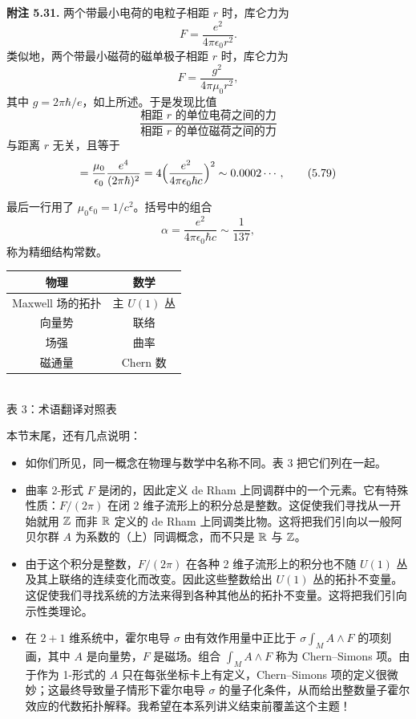 \textbf{附注 5.31.} 两个带最小电荷的电粒子相距 $r$ 时，库仑力为
\begin{equation}
  F=\frac{e^2}{4\pi\epsilon_0r^2}.
  \tag{5.76}
\end{equation}
类似地，两个带最小磁荷的磁单极子相距 $r$ 时，库仑力为
\begin{equation}
  F=\frac{g^2}{4\pi\mu_0r^2},
  \tag{5.77}
\end{equation}
其中 $g=2\pi\hbar/e$，如上所述。于是发现比值
\begin{equation}
  \frac{\text{相距 }r\text{ 的单位电荷之间的力}}{\text{相距 }r\text{ 的单位磁荷之间的力}}
  \tag{5.78}
\end{equation}
与距离 $r$ 无关，且等于
\begin{equation}
  =\frac{\mu_0}{\epsilon_0}\frac{e^4}{(2\pi\hbar)^2}
  =4\Bigl(\frac{e^2}{4\pi\epsilon_0\hbar c}\Bigr)^2\sim0.0002\cdots,
  \tag{5.79}
\end{equation}

最后一行用了 $\mu_0\epsilon_0=1/c^2$。括号中的组合
\begin{equation}
  \alpha=\frac{e^2}{4\pi\epsilon_0\hbar c}\sim\frac{1}{137},
  \tag{5.80}
\end{equation}
称为精细结构常数。\qedmark

\begin{center}
\begin{tabular}{cc}
\toprule
物理 & 数学\\
\midrule
Maxwell 场的拓扑 & 主 $U(1)$ 丛\\
向量势 & 联络\\
场强 & 曲率\\
磁通量 & Chern 数\\
\bottomrule
\end{tabular}\\[2pt]
{\small 表 3：术语翻译对照表}
\end{center}

本节末尾，还有几点说明：

\begin{itemize}
  \item 如你们所见，同一概念在物理与数学中名称不同。表 3 把它们列在一起。
  \item 曲率 2-形式 $F$ 是闭的，因此定义 de Rham 上同调群中的一个元素。它有特殊性质：$F/(2\pi)$ 在闭 2 维子流形上的积分总是整数。这促使我们寻找从一开始就用 $\mathbb{Z}$ 而非 $\mathbb{R}$ 定义的 de Rham 上同调类比物。这将把我们引向以一般阿贝尔群 $A$ 为系数的（上）同调概念，而不只是 $\mathbb{R}$ 与 $\mathbb{Z}$。
  \item 由于这个积分是整数，$F/(2\pi)$ 在各种 2 维子流形上的积分也不随 $U(1)$ 丛及其上联络的连续变化而改变。因此这些整数给出 $U(1)$ 丛的拓扑不变量。这促使我们寻找系统的方法来得到各种其他丛的拓扑不变量。这将把我们引向示性类理论。
  \item 在 $2+1$ 维系统中，霍尔电导 $\sigma$ 由有效作用量中正比于 $\sigma\int_MA\wedge F$ 的项刻画，其中 $A$ 是向量势，$F$ 是磁场。组合 $\int_MA\wedge F$ 称为 Chern--Simons 项。由于作为 1-形式的 $A$ 只在每张坐标卡上有定义，Chern--Simons 项的定义很微妙；这最终导致量子情形下霍尔电导 $\sigma$ 的量子化条件，从而给出整数量子霍尔效应的代数拓扑解释。我希望在本系列讲义结束前覆盖这个主题！
\end{itemize}


